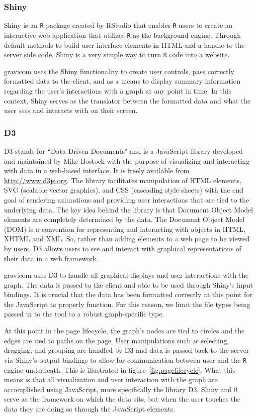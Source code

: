 \documentclass{article}\usepackage[]{graphicx}\usepackage[]{color}
\begin{document}
\subsubsection{Shiny}

Shiny \cite{rs-shiny} is an {\tt R} package created by RStudio that enables {\tt R} users to create an interactive web application that utilizes {\tt R} as the background engine. Through default methods to build user interface elements in HTML and a handle to the server side code, Shiny is a very simple way to turn {\tt R} code into a website. 

gravicom uses the Shiny functionality to create user controls, pass correctly formatted data to the client, and as a means to display summary information regarding the user's interactions with a graph at any point in time. In this context, Shiny serves as the translator between the formatted data and what the user sees and interacts with on their screen.


\subsubsection{D3}

D3 \cite{mb-d3} stands for ``Data Driven Documents" and is a JavaScript library developed and maintained by Mike Bostock with the  purpose of visualizing and interacting with data in a web-based interface. It is freely available from \url{http://www.d3js.org}. The library facilitates manipulation of HTML elements, SVG (scalable vector graphics), and CSS (cascading style sheets) with the end goal of rendering animations and providing user interactions that are tied to the underlying data. The key idea behind the library is that Document Object Model elements are completely determined by the data. The Document Object Model (DOM) is a convention for representing and interacting with objects in HTML, XHTML and XML. So, rather than adding elements to a web page to be viewed by users, D3 allows users to see and interact with graphical representations of their data in a web framework. 

gravicom uses D3 to handle all graphical displays and user interactions with the graph. The data is passed to the client and able to be used through Shiny's input bindings. It is crucial that the data has been formatted correctly at this point for the JavaScript to properly function. For this reason, we limit the file types being passed in to the tool to a robust graph-specific type.

At this point in the page lifecycle, the graph's nodes are tied to circles and the edges are tied to paths on the page. User manipulations such as selecting, dragging, and grouping are handled by D3 and  data is passed back to the server via Shiny's output bindings to allow for communication between user and the {\tt R} engine underneath. This is illustrated in figure~\ref{fig:pagelifecycle}. What this means is that all visualization and user interaction with the graph are accomplished using JavaScript, more specifically the library D3. Shiny and {\tt R} serve as the framework on which the data sits, but when the user touches the data they are doing so through the JavaScript elements. 
\end{document}

